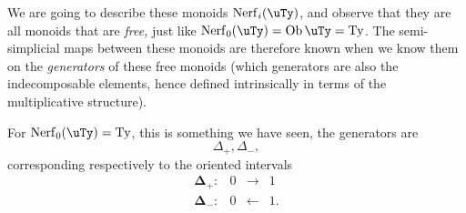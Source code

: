 We are going to describe these monoids $\mathrm{Nerf}_i(\uTy)$, and observe that they are all monoids that are \textit{free,} just like $\mathrm{Nerf}_0(\uTy) = \mathrm{Ob}\,\uTy = \mathrm{Ty}$. The semi-simplicial maps between these monoids are therefore known when we know them on the \textit{generators} of these free monoids (which generators are also the indecomposable elements, hence defined intrinsically in terms of the multiplicative structure). %

For $\mathrm{Nerf}_0(\uTy) = \mathrm{Ty}$, this is something we have seen, the generators are
\[
\Delta_+,\Delta_-,
\]
corresponding respectively to the oriented intervals
\[
\begin{array}{rccc}
\boldsymbol{\Delta}_+ : & 0 & \longrightarrow & 1\\[4pt]
\boldsymbol{\Delta}_- : & 0 & \longleftarrow & 1.
\end{array}
\]

